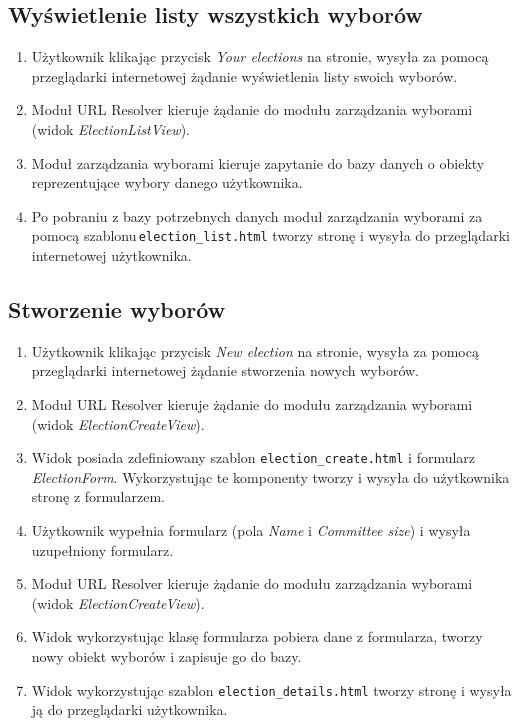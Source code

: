 \documentclass[pdflatex,11pt]{../aghdoc_version2}
\newcommand{\code}[1]{\texttt{#1}}
\begin{document}
\subsection{Wyświetlenie listy wszystkich wyborów}
\begin{enumerate}
\item Użytkownik klikając przycisk \textit{Your elections} na stronie, wysyła za pomocą
przeglądarki internetowej żądanie wyświetlenia listy swoich wyborów.
\item Moduł URL Resolver kieruje żądanie do modułu zarządzania wyborami (widok
\textit{ElectionListView}).
\item Moduł zarządzania wyborami kieruje zapytanie do bazy danych o obiekty
reprezentujące wybory danego użytkownika.
\item Po pobraniu z bazy potrzebnych danych moduł zarządzania wyborami za pomocą
szablonu\,\code{election\_list.html} tworzy stronę i wysyła do przeglądarki internetowej
użytkownika.
\end{enumerate}

\subsection{Stworzenie wyborów}
\begin{enumerate}
\item Użytkownik klikając przycisk \textit{New election} na stronie, wysyła za pomocą
przeglądarki internetowej żądanie stworzenia nowych wyborów.
\item Moduł URL Resolver kieruje żądanie do modułu zarządzania wyborami (widok
\textit{ElectionCreateView}).
\item Widok posiada zdefiniowany szablon \code{election\_create.html} i formularz \textit{ElectionForm}.
Wykorzystując te komponenty tworzy i wysyła do użytkownika stronę z formularzem.
\item Użytkownik wypełnia formularz (pola \textit{Name} i \textit{Committee size}) i wysyła uzupełniony
formularz.
\item Moduł URL Resolver kieruje żądanie do modułu zarządzania wyborami (widok
\textit{ElectionCreateView}).
\item Widok wykorzystując klasę formularza pobiera dane z formularza, tworzy nowy
obiekt wyborów i zapisuje go do bazy.
\item Widok wykorzystując szablon \code{election\_details.html} tworzy stronę i wysyła ją do
przeglądarki użytkownika.
\end{enumerate}
\clearpage
\end{document}
